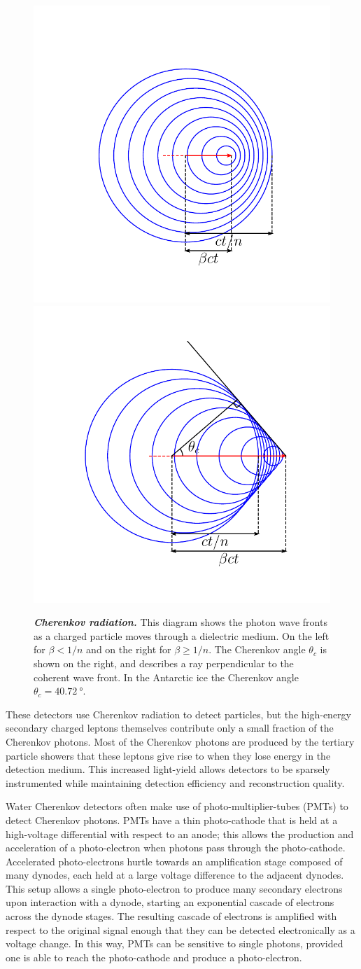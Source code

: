 \begin{figure}
	\centering
	\includegraphics[width=0.45\linewidth]{figures/no_cherenkov}
	\includegraphics[width=0.45\linewidth]{figures/cherenkov}
	\internallinenumbers
	\caption{\textbf{\textit{Cherenkov radiation.}}
		This diagram shows the photon wave fronts as a charged particle moves through a dielectric medium.
		On the left for $\beta < 1/n$ and on the right for $\beta \geq 1/n$.
		The Cherenkov angle $\theta_c$ is shown on the right, and describes a ray perpendicular to the coherent wave front.
		In the Antarctic ice the Cherenkov angle $\theta_c=\SI{40.72}\degree$.
	}\label{fig:cherenkov}
\end{figure}

These detectors use Cherenkov radiation to detect particles, but the high-energy secondary charged leptons themselves contribute only a small fraction of the Cherenkov photons.
Most of the Cherenkov photons are produced by the tertiary particle showers that these leptons give rise to when they lose energy in the detection medium.
This increased light-yield allows detectors to be sparsely instrumented while maintaining detection efficiency and reconstruction quality.

Water Cherenkov detectors often make use of photo-multiplier-tubes (PMTs) to detect Cherenkov photons.
PMTs have a thin photo-cathode that is held at a high-voltage differential with respect to an anode; this allows the production and acceleration of a photo-electron when photons pass through the photo-cathode.
Accelerated photo-electrons hurtle towards an amplification stage composed of many dynodes, each held at a large voltage difference to the adjacent dynodes.
This setup allows a single photo-electron to produce many secondary electrons upon interaction with a dynode, starting an exponential cascade of electrons across the dynode stages.
The resulting cascade of electrons is amplified with respect to the original signal enough that they can be detected electronically as a voltage change.
In this way, PMTs can be sensitive to single photons, provided one is able to reach the photo-cathode and produce a photo-electron.